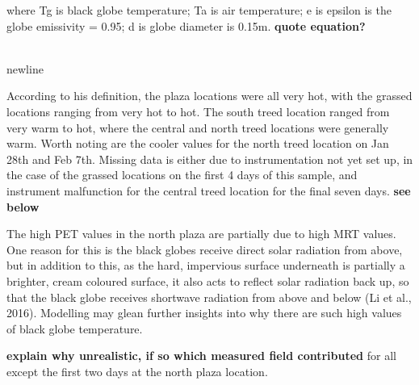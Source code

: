 \documentclass[twocolumn, a4paper]{article}
\providecommand{\comment}[1]{{\large\bf #1}}
\begin{document}
where Tg is black globe temperature; Ta is air temperature; e is epsilon is the globe emissivity = 0.95; d is globe diameter is 0.15m.
\comment{quote equation?} 

\\newline


According to his definition, the plaza locations were all very hot, with the grassed locations ranging from very hot to hot. The south treed location ranged from very warm to hot, where the central and north treed locations were generally warm. Worth noting are the cooler values for the north treed location on Jan 28th and Feb 7th. Missing data is either due to instrumentation not yet set up, in the case of the grassed locations on the first 4 days of this sample, and instrument malfunction for the central treed location for the final seven days.
\comment{see below}

The high PET values in the north plaza are partially due to high MRT values. One reason for this is the black globes receive direct solar radiation from above, but in addition to this, as the hard, impervious surface underneath is partially a brighter, cream coloured surface, it also acts to reflect solar radiation back up, so that the black globe receives shortwave radiation from above and below (Li et al., 2016).
Modelling may glean further insights into why there are such high values of black globe temperature.

\comment{explain why unrealistic, if so which measured field contributed} for all except the first two days at the north plaza location.
\end{document}
